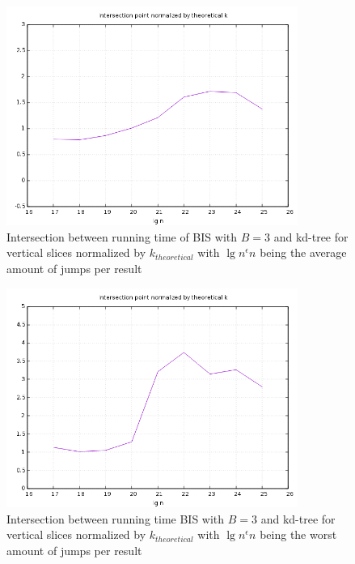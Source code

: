 \begin{figure}[h]
    \centering
    \includegraphics[width = 0.85\textwidth]{pictures/analysis/threes/vert_avg.png}
    \caption{Intersection between running time of BIS with $B=3$ and kd-tree for vertical slices normalized by $k_{theoretical}$ with $\lg n^\epsilon n$ being the average amount of jumps per result}\label{fig:b3_vert_theory}
\end{figure}

\begin{figure}[h]
    \centering
    \includegraphics[width = 0.85\textwidth]{pictures/analysis/threes/vert_worst.png}
    \caption{Intersection between running time BIS with $B=3$ and kd-tree for vertical slices normalized by $k_{theoretical}$ with $\lg n^\epsilon n$ being the worst amount of jumps per result}\label{fig:b3_vert_theory_worst}
\end{figure}


